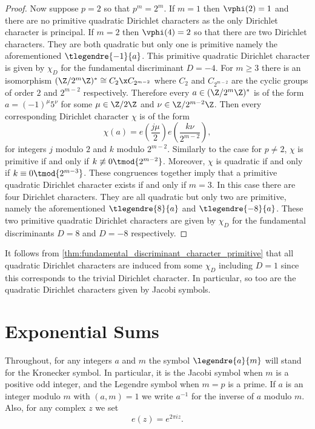 \documentclass[12pt]{article}
\begin{document}
\begin{proof}
        Now suppose \(p = 2\) so that \(p^{m} = 2^{m}\). If \(m = 1\) then \(\vphi(2) = 1\) and there are no primitive quadratic Dirichlet characters as the only Dirichlet character is principal. If \(m = 2\) then \(\vphi(4) = 2\) so that there are two Dirichlet characters. They are both quadratic but only one is primitive namely the aforementioned \(\tlegendre{-1}{a}\). This primitive quadratic Dirichlet character is given by \(\chi_{D}\) for the fundamental discriminant \(D = -4\). For \(m \ge 3\) there is an isomorphism \((\Z/2^{m}\Z)^{\ast} \cong C_{2} \x C_{2^{m-2}}\) where \(C_{2}\) and \(C_{2^{m-2}}\) are the cyclic groups of order \(2\) and \(2^{m-2}\) respectively. Therefore every \(a \in (\Z/2^{m}\Z)^{\ast}\) is of the form \(a = (-1)^{\mu}5^{\nu}\) for some \(\mu \in \Z/2\Z\) and \(\nu \in \Z/2^{m-2}\Z\). Then every corresponding Dirichlet character \(\chi\) is of the form
        \[
          \chi(a) = e\left(\frac{j\mu}{2}\right)e\left(\frac{k\nu}{2^{m-2}}\right),
        \]
        for integers \(j\) modulo \(2\) and \(k\) modulo \(2^{m-2}\). Similarly to the case for \(p \neq 2\), \(\chi\) is primitive if and only if \(k \not\equiv 0 \tmod{2^{m-2}}\). Moreover, \(\chi\) is quadratic if and only if \(k \equiv 0 \tmod{2^{m-3}}\). These congruences together imply that a primitive quadratic Dirichlet character exists if and only if \(m = 3\). In this case there are four Dirichlet characters. They are all quadratic but only two are primitive, namely the aforementioned \(\tlegendre{8}{a}\) and \(\tlegendre{-8}{a}\). These two primitive quadratic Dirichlet characters are given by \(\chi_{D}\) for the fundamental discriminants \(D = 8\) and \(D = -8\) respectively.
      \end{proof}

      It follows from \cref{thm:fundamental_discriminant_character_primitive} that all quadratic Dirichlet characters are induced from some \(\chi_{D}\) including \(D = 1\) since this corresponds to the trivial Dirichlet character. In particular, so too are the quadratic Dirichlet characters given by Jacobi symbols.
  \section{Exponential Sums}
    Throughout, for any integers \(a\) and \(m\) the symbol \(\legendre{a}{m}\) will stand for the Kronecker symbol. In particular, it is the Jacobi symbol when \(m\) is a positive odd integer, and the Legendre symbol when \(m = p\) is a prime. If \(a\) is an integer modulo \(m\) with \((a,m) = 1\) we write \(a^{-1}\) for the inverse of \(a\) modulo \(m\). Also, for any complex \(z\) we set
    \[
      e(z) = e^{2\pi iz}.
    \]
\end{document}
